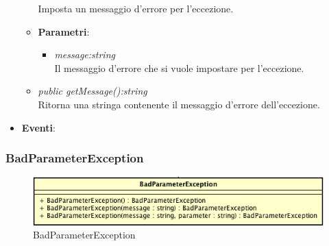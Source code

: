 \begin{itemize}
\begin{itemize}
	Imposta un messaggio d'errore per l'eccezione.
			\item{\textbf{Parametri}: \begin{itemize}
			\item \textit{message:string}\\
			Il messaggio d'errore che si vuole impostare per l'eccezione.
			\end{itemize}}
	\item \textit{public getMessage():string}\\
	Ritorna una stringa contenente il messaggio d'errore dell'eccezione.
	\end{itemize}
\item \textbf{Eventi}:
\end{itemize}

\subsubsection{BadParameterException}

\label{BadParameterException}
\begin{figure}[ht]
	\centering
	\includegraphics[scale=0.5]{Sezioni/SottosezioniST/img/app/BadParameterException.png}
	\caption{BadParameterException}
\end{figure}

